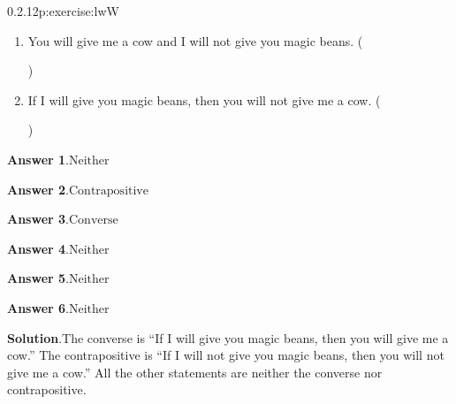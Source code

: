 \documentclass[twoside,11pt,]{book}
\newcommand{\blocktitlefont}{\relax}
\numberwithin{equation}{chapter}
\begin{document}
\begin{divisionsolution}{0.2.12}{}{p:exercise:lwW}
\begin{enumerate}[label=(\alph*)]
)\quad
%
\item{}You will give me a cow and I will not give you magic beans. \quad()\quad
%
\item{}If I will give you magic beans, then you will not give me a cow. \quad()\quad
%
\end{enumerate}
%
\par\smallskip%
\noindent\textbf{\blocktitlefont Answer 1}.\quad{}\(\text{Neither}\)%
\par\smallskip%
\noindent\textbf{\blocktitlefont Answer 2}.\quad{}\(\text{Contrapositive}\)%
\par\smallskip%
\noindent\textbf{\blocktitlefont Answer 3}.\quad{}\(\text{Converse}\)%
\par\smallskip%
\noindent\textbf{\blocktitlefont Answer 4}.\quad{}\(\text{Neither}\)%
\par\smallskip%
\noindent\textbf{\blocktitlefont Answer 5}.\quad{}\(\text{Neither}\)%
\par\smallskip%
\noindent\textbf{\blocktitlefont Answer 6}.\quad{}\(\text{Neither}\)%
\par\smallskip%
\noindent\textbf{\blocktitlefont Solution}.\quad{}The converse is ``If I will give you magic beans, then you will give me a cow.'' The contrapositive is ``If I will not give you magic beans, then you will not give me a cow.'' All the other statements are neither the converse nor contrapositive.%
\end{divisionsolution}%
\end{document}
